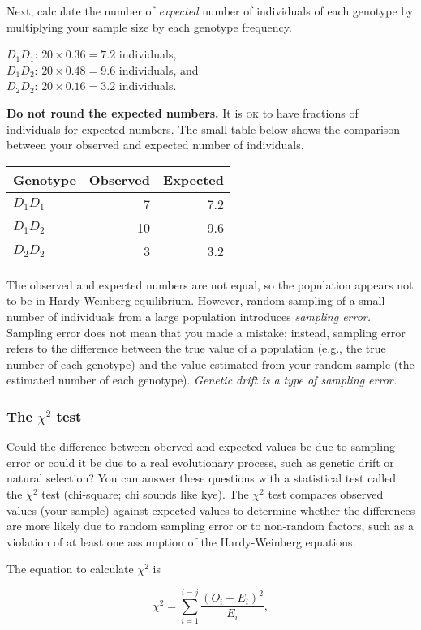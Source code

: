 \documentclass[12pt][hidelinks]{exam}
\begin{document}
\begin{questions}
Next, calculate the number of \emph{expected} number of individuals of each 
genotype by multiplying your sample size by each genotype frequency.

$D_1D_1$: $20 \times 0.36 = 7.2$ individuals,\\
$D_1D_2$: $20 \times 0.48 = 9.6$ individuals, and\\
$D_2D_2$: $20 \times 0.16 = 3.2$ individuals.

\textbf{Do not round the expected numbers.} It is \textsc{ok} to have 
fractions of individuals for expected numbers. The small table below 
shows the comparison between your observed and expected number of individuals.

\begin{longtable}{lrr}
	\toprule
	Genotype	& Observed	& Expected \tabularnewline
	\midrule
	$D_1D_1$ & 7  & 7.2 \tabularnewline
	$D_1D_2$ & 10 & 9.6 \tabularnewline
	$D_2D_2$ & 3  & 3.2 \tabularnewline
	\bottomrule
\end{longtable}	

The observed and expected numbers are not equal, so the population appears not 
to be in Hardy-Weinberg equilibrium. However, random sampling of a small number 
of individuals from a large population introduces \emph{sampling error.} Sampling 
error does not mean that you made a mistake; instead, sampling error refers to 
the difference between the true value of a population (e.g., the true number of 
each genotype) and the value estimated from your random sample (the estimated 
number of each genotype). \emph{Genetic drift is a type of sampling error.}

\subsubsection*{The $\chi^2$ test}

Could the difference between oberved and expected values be due to sampling 
error or could it be due to a real evolutionary process, such as genetic drift 
or natural selection? You can answer these questions with a statistical test 
called the $\chi^2$ test (chi-square; chi sounds like kye). The $\chi^2$ test 
compares observed values (your sample) against expected values to determine 
whether the differences are more likely due to random sampling error or to 
non-random factors, such as a violation of at least one assumption of the 
Hardy-Weinberg equations.
 
The equation to calculate $\chi^2$ is 

\[\chi^2 = \sum_{i=1}^{i=j}\frac{(O_i - E_i)^2}{E_i}, \]


\end{questions}
\end{document}
